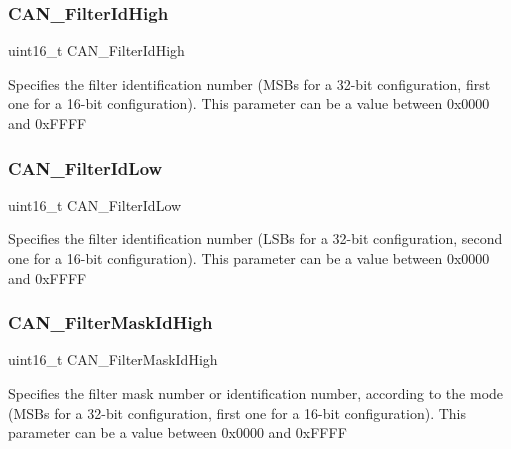 \subsubsection{\texorpdfstring{CAN\_FilterIdHigh}{CAN\_FilterIdHigh}}
{\footnotesize\ttfamily uint16\+\_\+t C\+A\+N\+\_\+\+Filter\+Id\+High}

Specifies the filter identification number (M\+S\+Bs for a 32-\/bit configuration, first one for a 16-\/bit configuration). This parameter can be a value between 0x0000 and 0x\+F\+F\+FF \mbox{\label{struct_c_a_n___filter_init_type_def_a3ca3a0b0d3b7617b8bb5bbb7d4ca23cf}} 
\subsubsection{\texorpdfstring{CAN\_FilterIdLow}{CAN\_FilterIdLow}}
{\footnotesize\ttfamily uint16\+\_\+t C\+A\+N\+\_\+\+Filter\+Id\+Low}

Specifies the filter identification number (L\+S\+Bs for a 32-\/bit configuration, second one for a 16-\/bit configuration). This parameter can be a value between 0x0000 and 0x\+F\+F\+FF \mbox{\label{struct_c_a_n___filter_init_type_def_a66d56c2f432920189ae4b046c325fba6}} 
\subsubsection{\texorpdfstring{CAN\_FilterMaskIdHigh}{CAN\_FilterMaskIdHigh}}
{\footnotesize\ttfamily uint16\+\_\+t C\+A\+N\+\_\+\+Filter\+Mask\+Id\+High}

Specifies the filter mask number or identification number, according to the mode (M\+S\+Bs for a 32-\/bit configuration, first one for a 16-\/bit configuration). This parameter can be a value between 0x0000 and 0x\+F\+F\+FF \mbox{\label{struct_c_a_n___filter_init_type_def_a3677d330355ee09293b3ee8c055b58a5}} 
